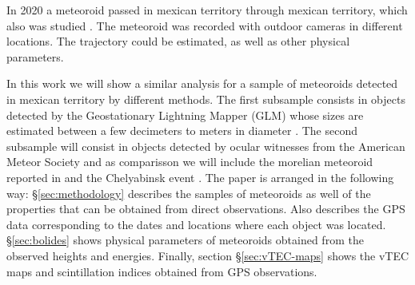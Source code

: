In 2020 a meteoroid passed in mexican territory through mexican territory, which also was studied \citep{Sergeeva:2020}. The meteoroid was recorded with outdoor cameras in different locations. The trajectory could be estimated, as well as other physical parameters.

In this work we will show a similar analysis for a sample of meteoroids detected in mexican territory by different methods. The first subsample consists in objects detected by the Geostationary Lightning Mapper (GLM) whose sizes are estimated between a few decimeters to meters in diameter \citep{GOODMAN:2013, Jenniskens:2018, Rumpf:2019}. The second subsample will consist in objects detected by ocular witnesses from the American Meteor Society and as comparisson we will include the morelian meteoroid reported in \citet{Sergeeva:2020} and the Chelyabinsk event \citet{Yang:2014}. The paper is arranged in the following way: \S \ref{sec:methodology} describes the samples of meteoroids as well of the properties that can be obtained from direct observations. Also describes the GPS data corresponding to the dates and locations where each object was located. \S \ref{sec:bolides} shows physical parameters of meteoroids obtained from the observed heights and energies. Finally, section \S \ref{sec:vTEC-maps} shows the vTEC maps and scintillation indices obtained from GPS observations.  